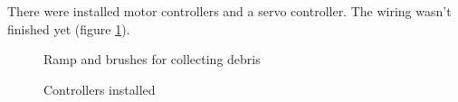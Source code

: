 There were installed motor controllers and a servo controller. The wiring wasn't finished yet (figure \ref{Controllers1.3}).

\begin{figure}[H]
	\begin{minipage}[h]{0.58\linewidth}
		\caption{Ramp and brushes for collecting debris}
		\label{Gripper2.2}
	\end{minipage}
	\hfill
	\begin{minipage}[h]{0.37\linewidth}
		\caption{Controllers installed}
		\label{Controllers1.3}
	\end{minipage}
\end{figure}
